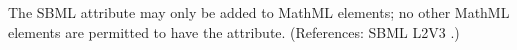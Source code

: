 The SBML attribute  may only be added to MathML 
elements; no other MathML elements are permitted to have the 
attribute.  (References: SBML L2V3 .)
